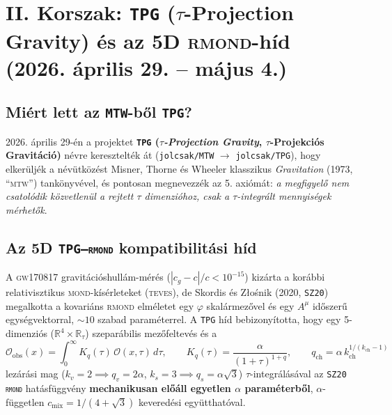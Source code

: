 \documentclass[11pt,a4paper]{article}
\begin{document}
\section{II. Korszak: \texttt{TPG} ($\tau$-Projection Gravity) és az 5D \textsc{rmond}-híd (2026. április 29. -- május 4.)}

\subsection{Miért lett az \texttt{MTW}-b\H{o}l \texttt{TPG}?}
2026. április 29-én a projektet \textbf{\texttt{TPG} (\emph{$\tau$-Projection Gravity}, $\tau$-Projekciós Gravitáció)} névre keresztelték át (\texttt{jolcsak/MTW} $\to$ \texttt{jolcsak/TPG}), hogy elkerüljék a névütközést Misner, Thorne és Wheeler klasszikus \emph{Gravitation} (1973, ``\textsc{mtw}'') tankönyvével, és pontosan megnevezzék az 5. axiómát: \emph{a megfigyel\H{o} nem csatolódik közvetlenül a rejtett $\tau$ dimenzióhoz, csak a $\tau$-integrált mennyiségek mérhet\H{o}k}.

\subsection{Az 5D \texttt{TPG--\textsc{rmond}} kompatibilitási híd}
A \textsc{gw170817} gravitációshullám-mérés ($|c_g - c|/c < 10^{-15}$) kizárta a korábbi relativisztikus \textsc{mond}-kísérleteket (\textsc{teves}), de Skordis és Z\l{}o\'snik (2020, \texttt{SZ20}) megalkotta a kovariáns \textsc{rmond} elméletet egy $\varphi$ skalármez\H{o}vel és egy $A^\mu$ id\H{o}szer\H{u} egységvektorral, $\sim 10$ szabad paraméterrel. A \texttt{TPG} híd bebizonyította, hogy egy 5-dimenziós ($\mathbb{R}^4 \times \mathbb{R}_\tau$) szeparábilis mez\H{o}feltevés és a
\begin{equation}
\mathcal{O}_{\mathrm{obs}}(x) = \int_0^\infty K_q(\tau)\,\mathcal{O}(x,\tau)\,d\tau, \qquad K_q(\tau) = \frac{\alpha}{(1+\tau)^{1+q}}, \qquad q_{\mathrm{ch}} = \alpha\,k_{\mathrm{ch}}^{1/(k_{\mathrm{ch}}-1)}
\end{equation}
lezárási mag ($k_v = 2 \implies q_v = 2\alpha$, $k_s = 3 \implies q_s = \alpha\sqrt{3}$) $\tau$-integrálásával az \texttt{SZ20 \textsc{rmond}} hatásfüggvény \textbf{mechanikusan el\H{o}áll egyetlen $\alpha$ paraméterb\H{o}l}, $\alpha$-független $c_{\mathrm{mix}} = 1/(4+\sqrt{3})$ keveredési együtthatóval.
\end{document}
